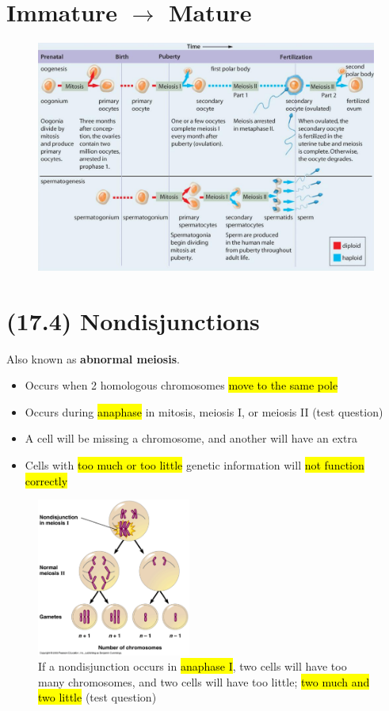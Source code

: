 \documentclass[a4paper,12pt]{article}
\begin{document}
\section{Immature $\longrightarrow$ Mature}
\begin{figure}[H]
    \centering
    \includegraphics[width=\textwidth]{genesis}
\end{figure}

\section{(17.4) Nondisjunctions}
Also known as \textbf{abnormal meiosis}.
\begin{itemize}
    \item{Occurs when 2 homologous chromosomes \hl{move to the same pole}}
    \item{Occurs during \hl{anaphase} in mitosis, meiosis I, or meiosis II (test question)}
    \item{A cell will be missing a chromosome, and another will have an extra}
    \item{Cells with \hl{too much or too little} genetic information will \hl{not function correctly}}
\end{itemize}

\begin{figure}[H]
    \centering
    \includegraphics[width=0.45\textwidth]{nonj1}
    \caption{If a nondisjunction occurs in \hl{anaphase I}, two cells will have too many chromosomes, and two cells will have too little; \hl{two much and two little} (test question)}
\end{figure}
\end{document}
